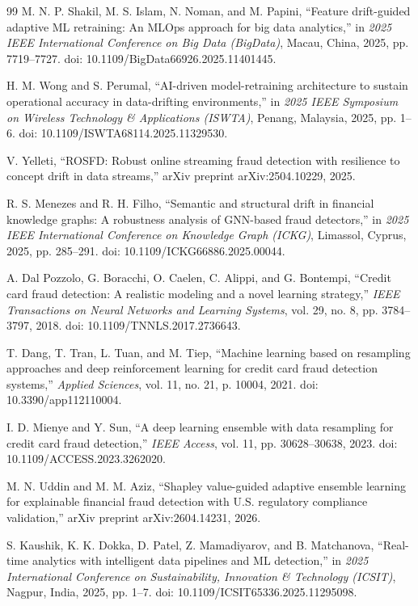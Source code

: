\begin{thebibliography}{99}
M. N. P. Shakil, M. S. Islam, N. Noman, and M. Papini, ``Feature drift-guided adaptive ML retraining: An MLOps approach for big data analytics,'' in \textit{2025 IEEE International Conference on Big Data (BigData)}, Macau, China, 2025, pp. 7719--7727. doi: 10.1109/BigData66926.2025.11401445.

H. M. Wong and S. Perumal, ``AI-driven model-retraining architecture to sustain operational accuracy in data-drifting environments,'' in \textit{2025 IEEE Symposium on Wireless Technology \& Applications (ISWTA)}, Penang, Malaysia, 2025, pp. 1--6. doi: 10.1109/ISWTA68114.2025.11329530.

V. Yelleti, ``ROSFD: Robust online streaming fraud detection with resilience to concept drift in data streams,'' arXiv preprint arXiv:2504.10229, 2025.

R. S. Menezes and R. H. Filho, ``Semantic and structural drift in financial knowledge graphs: A robustness analysis of GNN-based fraud detectors,'' in \textit{2025 IEEE International Conference on Knowledge Graph (ICKG)}, Limassol, Cyprus, 2025, pp. 285--291. doi: 10.1109/ICKG66886.2025.00044.

A. Dal Pozzolo, G. Boracchi, O. Caelen, C. Alippi, and G. Bontempi, ``Credit card fraud detection: A realistic modeling and a novel learning strategy,'' \textit{IEEE Transactions on Neural Networks and Learning Systems}, vol. 29, no. 8, pp. 3784--3797, 2018. doi: 10.1109/TNNLS.2017.2736643.

T. Dang, T. Tran, L. Tuan, and M. Tiep, ``Machine learning based on resampling approaches and deep reinforcement learning for credit card fraud detection systems,'' \textit{Applied Sciences}, vol. 11, no. 21, p. 10004, 2021. doi: 10.3390/app112110004.

I. D. Mienye and Y. Sun, ``A deep learning ensemble with data resampling for credit card fraud detection,'' \textit{IEEE Access}, vol. 11, pp. 30628--30638, 2023. doi: 10.1109/ACCESS.2023.3262020.

M. N. Uddin and M. M. Aziz, ``Shapley value-guided adaptive ensemble learning for explainable financial fraud detection with U.S. regulatory compliance validation,'' arXiv preprint arXiv:2604.14231, 2026.

S. Kaushik, K. K. Dokka, D. Patel, Z. Mamadiyarov, and B. Matchanova, ``Real-time analytics with intelligent data pipelines and ML detection,'' in \textit{2025 International Conference on Sustainability, Innovation \& Technology (ICSIT)}, Nagpur, India, 2025, pp. 1--7. doi: 10.1109/ICSIT65336.2025.11295098.


\end{thebibliography}
